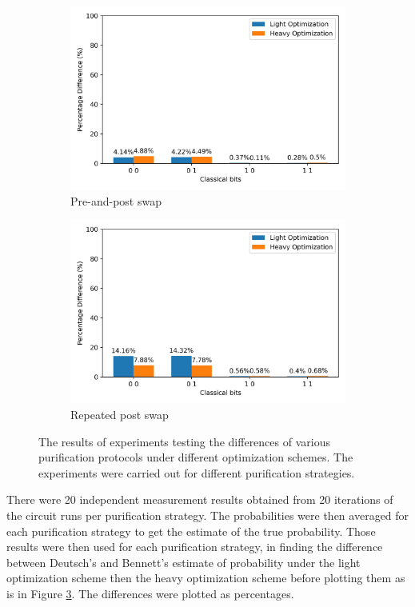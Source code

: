 \documentclass[11pt]{article}
\begin{document}
\begin{figure}[ht]
  \begin{subfigure}[b]{0.45\textwidth}
    \includegraphics[width=\linewidth]{figures/po_pre_and_post_swap.jpg}
    \caption{Pre-and-post swap}
    \label{fig:po_all_pre_post_swap}
  \end{subfigure}
  \begin{subfigure}[b]{0.45\textwidth}
    \includegraphics[width=\linewidth]{figures/po_repeated_post_swap.jpg}
    \caption{Repeated post swap}
    \label{fig:po_all_repeated_post_swap}
  \end{subfigure}
  \caption[Purification optimization results]{The results of experiments testing the differences of various purification protocols under different optimization schemes. The experiments were carried out for different purification strategies.}
  \label{fig:po_all}
\end{figure}
There were 20 independent measurement results obtained from 20 iterations of the circuit runs per purification strategy. The probabilities were then averaged for each purification strategy to get the estimate of the true probability. Those results were then used for each purification strategy, in finding the difference between Deutsch's and Bennett's estimate of probability under the light optimization scheme then the heavy optimization scheme before plotting them as is in Figure \ref{fig:po_all}. The differences were plotted as percentages.
\end{document}
